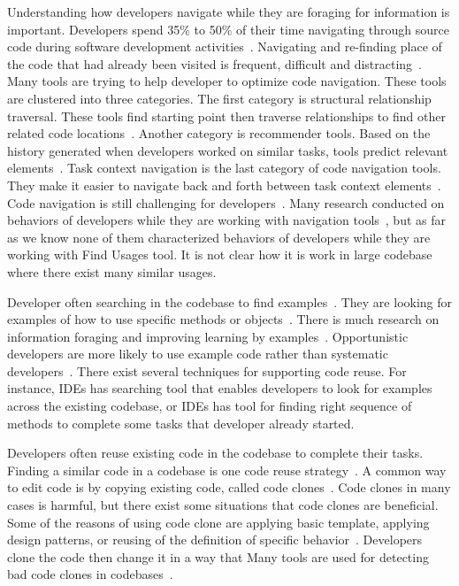 \documentclass[conference]{IEEEtran}
\begin{document}
Understanding how developers navigate while they are foraging for information is important. Developers spend 35\% to 50\% of their time navigating through source code during software development activities~\cite{ko2006exploratory,piorkowski2013whats}. Navigating and re-finding place of the code that had already been visited is frequent, difficult and distracting~\cite{ko2005eliciting,deline2005towards}. Many tools  are trying to help developer to optimize code navigation. These tools are clustered into three categories. The first category is structural relationship traversal. These tools find starting point then traverse relationships to find other related code locations~\cite{karrer2011stacksplorer,augustine2015field,latoza2011visualizing}. Another category is recommender tools. Based on the history generated when developers worked on similar tasks, tools predict relevant elements~\cite{zimmermann2005mining,deline2005easing}. Task context navigation is the last category of code navigation tools. They make it easier to navigate back and forth between task context elements~\cite{ko2006exploratory}. Code navigation is still challenging for developers~\cite{albusays2017interviews}. Many research conducted on behaviors of developers while they are working with navigation tools~\cite{ko2006exploratory}, but as far as we know none of them characterized behaviors of developers while they are working with Find Usages tool. It is not clear how it is work in large codebase where there exist many similar usages.\par

Developer often searching in the codebase to find examples~\cite{rosson1996reuse}. They are looking for examples of how to use specific methods or objects~\cite{stylos2006mica,umarji2008archetypal}. There is much research on information foraging and improving learning by examples~\cite{brandt2009two}. Opportunistic developers are more likely to use example code rather than systematic developers~\cite{head2018not}. There exist several techniques for supporting code reuse. For instance, IDEs has searching tool that enables developers to look for examples across the existing codebase, or IDEs has tool for finding right sequence of methods to complete some tasks that developer already started.\par

Developers often reuse existing code in the codebase to complete their tasks. Finding a similar code in a codebase is one code reuse strategy~\cite{rosson1996reuse}. A common way to edit code is by copying existing code, called code clones~\cite{codeCloneDetection2019,hou2009cnp}. Code clones in many cases is harmful, but there exist some situations that code clones are beneficial. Some of the reasons of using code clone are applying basic template, applying design patterns, or reusing of the definition of specific behavior~\cite{kim2004ethnographic,kapser2008cloning}. Developers clone the code then change it in a way that Many tools are used for detecting bad code clones in codebases~\cite{bellon2007comparison}.\par 
\end{document}
